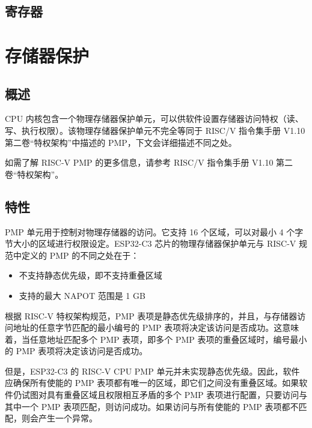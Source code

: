 \documentclass[main\_\_CN.tex]{subfiles}
\begin{document}

\subsection{寄存器}




\clearpage
\section{存储器保护}
\label{sec:riscvcpu-pmp}

\subsection{概述}
\label{sec:riscvcpu-pmp-overview}
CPU 内核包含一个物理存储器保护单元，可以供软件设置存储器访问特权（读、写、执行权限）。该物理存储器保护单元不完全等同于 RISC\-/V 指令集手册 V1.10 第二卷“特权架构”中描述的 PMP，下文会详细描述不同之处。

如需了解 RISC-V PMP 的更多信息，请参考 RISC\-/V 指令集手册 V1.10 第二卷“特权架构”。

\subsection{特性}
\label{sec:riscvcpu-pmp-features}
PMP 单元用于控制对物理存储器的访问。它支持 16 个区域，可以对最小 4 个字节大小的区域进行权限设定。ESP32-C3 芯片的物理存储器保护单元与 RISC-V 规范中定义的 PMP 的不同之处在于： 
\begin{itemize}
    \item {不支持静态优先级，即不支持重叠区域}
    \item {支持的最大 NAPOT 范围是 1 GB}
\end{itemize}

根据 RISC-V 特权架构规范，PMP 表项是静态优先级排序的，并且，与存储器访问地址的任意字节匹配的最小编号的 PMP 表项将决定该访问是否成功。这意味着，当任意地址匹配多个 PMP 表项，即多个 PMP 表项的重叠区域时，编号最小的 PMP 表项将决定该访问是否成功。

但是，ESP32-C3 的 RISC-V CPU PMP 单元并未实现静态优先级。因此，软件应确保所有使能的 PMP 表项都有唯一的区域，即它们之间没有重叠区域。如果软件仍试图对具有重叠区域且权限相互矛盾的多个 PMP 表项进行配置，只要访问与其中一个 PMP 表项匹配，则访问成功。如果访问与所有使能的 PMP 表项都不匹配，则会产生一个异常。
\end{document}
